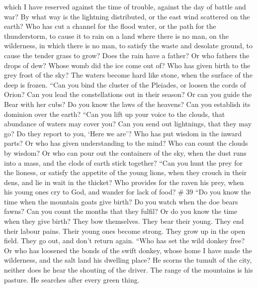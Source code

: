  which I have reserved against the time of trouble, against
the day of battle and war?  By what way is the lightning
distributed, or the east wind scattered on the earth?  Who
has cut a channel for the flood water, or the path for the thunderstorm,
 to cause it to rain on a land where there is no man, on
the wilderness, in which there is no man,  to satisfy the
waste and desolate ground, to cause the tender grass to grow?
 Does the rain have a father? Or who fathers the drops of
dew?  Whose womb did the ice come out of? Who has given
birth to the grey frost of the sky?  The waters become hard
like stone, when the surface of the deep is frozen.  ``Can
you bind the cluster of the Pleiades, or loosen the cords of Orion?
 Can you lead the constellations out in their season? Or
can you guide the Bear with her cubs?  Do you know the laws
of the heavens? Can you establish its dominion over the earth?
 ``Can you lift up your voice to the clouds, that abundance
of waters may cover you?  Can you send out lightnings, that
they may go? Do they report to you, `Here we are'?  Who has
put wisdom in the inward parts? Or who has given understanding to the
mind?  Who can count the clouds by wisdom? Or who can pour
out the containers of the sky,  when the dust runs into a
mass, and the clods of earth stick together?  ``Can you
hunt the prey for the lioness, or satisfy the appetite of the young
lions,  when they crouch in their dens, and lie in wait in
the thicket?  Who provides for the raven his prey, when his
young ones cry to God, and wander for lack of food? \# 39 
``Do you know the time when the mountain goats give birth? Do you watch
when the doe bears fawns?  Can you count the months that
they fulfil? Or do you know the time when they give birth? 
They bow themselves. They bear their young. They end their labour pains.
 Their young ones become strong. They grow up in the open
field. They go out, and don't return again.  ``Who has set
the wild donkey free? Or who has loosened the bonds of the swift donkey,
 whose home I have made the wilderness, and the salt land
his dwelling place?  He scorns the tumult of the city,
neither does he hear the shouting of the driver.  The range
of the mountains is his pasture. He searches after every green thing.
